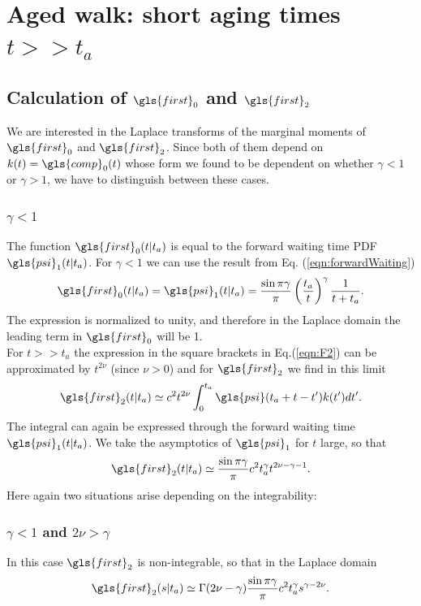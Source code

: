 \section{Aged walk: short aging times $t>> t_a$}

\subsection*{Calculation of $\gls{first}_0$ and $\gls{first}_2$}

We are interested in the Laplace transforms of the marginal moments of $\gls{first}_0$ and $\gls{first}_2$. Since both of them depend on $k(t)=\gls{comp}_0(t)$ 
whose form we found to be dependent on whether $\gamma<1$ or $\gamma>1$, we have to distinguish between these cases.

\subsubsection{$\gamma<1$}
The function $\gls{first}_0(t|t_a)$ is equal to the forward waiting time PDF $\gls{psi}_1(t|t_a)$. For $\gamma<1$ we can use the result from Eq. (\ref{eqn:forwardWaiting})
\begin{equation}
 \gls{first}_0(t|t_a) = \gls{psi}_1(t|t_a) = \frac{\sin \pi \gamma}{\pi} \left( \frac{t_a}{t}\right)^\gamma \frac{1}{t+t_a}. \label{eqn:psi1}
\end{equation}
The expression is normalized to unity, and therefore in the Laplace domain the leading term in $\gls{first}_0$ will be 1. \\

For  $t>>t_a$ the expression in the square brackets in Eq.(\ref{eqn:F2}) can be approximated by $t^{2\nu}$ (since $\nu > 0$) and for $\gls{first}_2$ we find in this limit
\begin{equation}
 \gls{first}_2(t|t_a) \simeq  c^2 t^{2\nu} \int_0^{t_a} \gls{psi}(t_a+t-t') k(t') dt'.
\end{equation}
The integral can again be expressed through the forward waiting time $\gls{psi}_1(t|t_a)$. We take the asymptotics of $\gls{psi}_1$ for $t$ large, so that 
\begin{equation}
\gls{first}_2(t|t_a) \simeq \frac{\sin \pi \gamma}{\pi} c^2  t_a^\gamma t^{2\nu-\gamma -1}  .  
\end{equation}
Here again two situations arise depending on the integrability: 

\subsubsection{$\gamma <1$ and  $2 \nu > \gamma$}
In this case $\gls{first}_2$ is non-integrable, so that in the Laplace domain
\begin{equation}
 \gls{first}_2(s|t_a) \simeq \Gamma(2\nu-\gamma) \frac{\sin \pi \gamma}{\pi} c^2 t_a^\gamma s^{\gamma - 2\nu}.
\end{equation}

